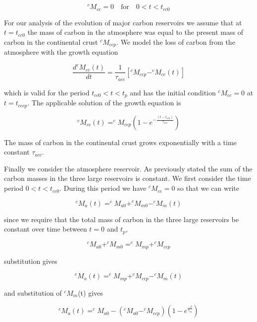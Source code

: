 \begin{equation}
  ^cM_{cc} = 0 \quad \text{for} \quad 0 < t < t_{cc0}
\end{equation}

For our analysis of the evolution of major carbon reservoirs we assume that at $t=t_{cc0}$ the mass of carbon in the atmosphere was equal to the present mass of carbon in the continental crust $^cM_{ccp}$. We model the loss of carbon from the atmosphere with the growth equation

\begin{equation}
    \frac{d ^cM_{cc}(t)}{d t} = \frac{1}{\tau_{acc}} [^cM_{ccp} - ^cM_{cc}(t)]
\end{equation}

which is valid for the period $t_{cc0} < t < t_p$ and has the initial condition $^cM_{cc} = 0$ at $t = t_{cccp}$. The applicable solution of the growth equation is

\begin{equation}
    ^cM_{cc}(t) = ^cM_{ccp} (1 - e^{-\frac{(t-t_{cc0})}{\tau_{acc}}} )
\end{equation}

The mass of carbon in the continental crust grows exponentially with a time constant $\tau_{acc}$.

Finally we consider the atmosphere reservoir. As previously stated the sum of the carbon masses in the three large reservoirs is constant. We first consider the time period $0 < t < t_{cc0}$. During this period we have $^cM_{cc}=0$ so that we can write

\begin{equation}
    ^cM_{a}(t) = ^cM_{a0} + ^cM_{m0} - ^cM_{m}(t)
\end{equation}

since we require that the total mass of carbon in the three large reservoirs be constant over time between $t=0$ and $t_p$,

\begin{equation}
  ^cM_{a0} + ^cM_{m0} = ^cM_{mp} + ^cM_{ccp}
\end{equation}

substitution gives 

\begin{equation}
    ^cM_{a}(t) = ^cM_{mp} + ^cM_{ccp} - ^cM_{m}(t)
\end{equation}

and substitution of $^cM_{m}$(t) gives

\begin{equation}
    ^cM_{a}(t) = ^cM_{a0} - (^cM_{a0} - ^cM_{ccp})(1 - e^{\frac{-t}{\tau_{ca}}})
\end{equation}

